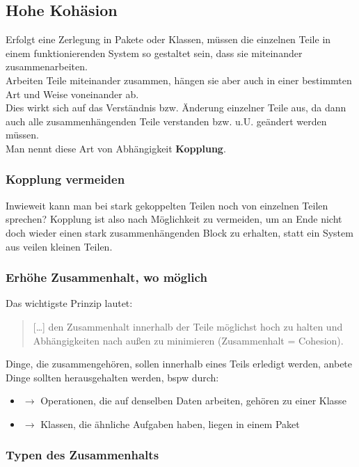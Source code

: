 \subsection{Hohe Kohäsion}
Erfolgt eine Zerlegung in Pakete oder Klassen, müssen die einzelnen Teile in einem funktionierenden System so gestaltet sein, dass sie miteinander zusammenarbeiten.\\
Arbeiten Teile miteinander zusammen, hängen sie aber auch in einer bestimmten Art und Weise voneinander ab.\\
Dies wirkt sich auf das Verständnis bzw. Änderung einzelner Teile aus, da dann auch alle zusammenhängenden Teile verstanden bzw. u.U. geändert werden müssen.\\

\noindent
Man nennt diese Art von Abhängigkeit \textbf{Kopplung}.

\subsubsection*{Kopplung vermeiden}
Inwieweit kann man bei stark gekoppelten Teilen noch von einzelnen Teilen sprechen? Kopplung ist also nach Möglichkeit zu vermeiden, um an Ende nicht doch wieder einen stark zusammenhängenden Block zu erhalten, statt ein System aus veilen kleinen Teilen.

\subsubsection*{Erhöhe Zusammenhalt, wo möglich}
Das wichtigste Prinzip lautet:

\blockquote[{\cite[71]{Wed09b}}]{
[\ldots] den Zusammenhalt innerhalb der Teile möglichst hoch zu halten und Abhängigkeiten nach außen zu minimieren (Zusammenhalt = Cohesion).
}
\noindent
Dinge, die zusammengehören, sollen innerhalb eines Teils erledigt werden, anbete Dinge sollten herausgehalten werden, bspw durch:

\begin{itemize}
    \item $\rightarrow$ Operationen, die auf denselben Daten arbeiten, gehören zu einer Klasse
    \item $\rightarrow$ Klassen, die ähnliche Aufgaben haben, liegen in einem Paket
\end{itemize}

\subsubsection*{Typen des Zusammenhalts}

